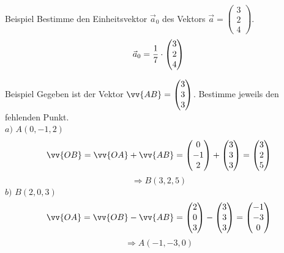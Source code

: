 \documentclass{article}
\begin{document}
\begin{boxx}[DarkBlue]{Beispiel}
    Bestimme den Einheitsvektor $\vec{a}_0$ des Vektors $\vec{a} = \begin{pmatrix}3 \\ 2 \\ 4\end{pmatrix}$.
    \[\vec{a}_0 = \frac{1}{7} \cdot \begin{pmatrix}3\\2\\4\end{pmatrix} \\\]
\end{boxx}
\begin{boxx}[DarkBlue]{Beispiel}
    Gegeben ist der Vektor $\displaystyle \vv{AB} = \begin{pmatrix}3\\3\\3\end{pmatrix}$.
    Bestimme jeweils den fehlenden Punkt. \\
    $a)$\hspace{3mm} $A(0,-1,2)$
    \[\vv{OB} = \vv{OA} + \vv{AB} = \begin{pmatrix}0\\-1\\2\end{pmatrix} + \begin{pmatrix}3\\3\\3\end{pmatrix} = \begin{pmatrix}3\\2\\5\end{pmatrix}\]
    \[\Rightarrow B(3,2,5)\]
    $b)$\hspace{3mm} $B(2,0,3)$
    \[\vv{OA} = \vv{OB} - \vv{AB} = \begin{pmatrix}2\\0\\3\end{pmatrix} - \begin{pmatrix}3\\3\\3\end{pmatrix} = \begin{pmatrix}-1\\-3\\0\end{pmatrix}\]
    \[\Rightarrow A(-1,-3,0)\]
\end{boxx}
\end{document}
